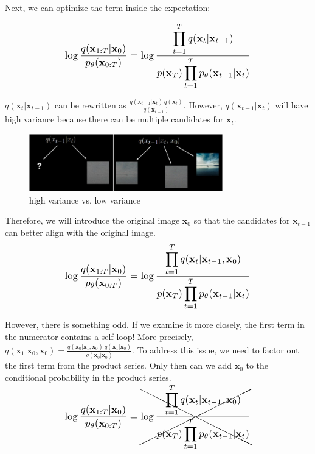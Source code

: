 \documentclass{article}
\newcommand*{\Scale}[2][4]{\scalebox{#1}{\ensuremath{#2}}}
\begin{document}
Next, we can optimize the term inside the expectation:

\begin{equation}
\Scale[1.2]{ \displaystyle \log \frac{q(\textbf{x}_{1:T}|\textbf{x}_0)}{p_\theta(\textbf{x}_{0:T})} = \log \frac{\displaystyle \prod_{t=1}^{T} q(\textbf{x}_{t}|\textbf{x}_{t-1})}{p(\textbf{x}_T) \displaystyle \prod_{t=1}^{T} p_\theta(\textbf{x}_{t-1}|\textbf{x}_{t})} }
\end{equation}

$ q(\textbf{x}_{t}|\textbf{x}_{t-1}) $ can be rewritten as $ \frac{q(\textbf{x}_{t-1}|\textbf{x}_t) \ q(\textbf{x}_t) }{ q(\textbf{x}_{t-1}) } $. However, $ q(\textbf{x}_{t-1}|\textbf{x}_t) $ will have high variance because there can be multiple candidates for $ \textbf{x}_{t} $.
\begin{figure}[h]
    \centering
    \includegraphics[width=0.75\textwidth]{fig/high-variance-vs-low-variance.png}
    \caption{high variance vs. low variance}
    \label{fig:high-variance-vs-low-variance}
\end{figure}

Therefore, we will introduce the original image $ \textbf{x}_0 $ so that the candidates for $ \textbf{x}_{t-1} $ can better align with the original image.
\begin{equation}
\Scale[1.2]{ \displaystyle \log \frac{q(\textbf{x}_{1:T}|\textbf{x}_0)}{p_\theta(\textbf{x}_{0:T})} = \log \frac{\displaystyle \prod_{t=1}^{T} q(\textbf{x}_{t}|\textbf{x}_{t-1},\textbf{x}_0) } { p(\textbf{x}_T) \displaystyle \prod_{t=1}^{T} p_\theta(\textbf{x}_{t-1}|\textbf{x}_{t})} }
\end{equation}

However, there is something odd. If we examine it more closely, the first term in the numerator contains a self-loop! More precisely, $ q(\textbf{x}_1|\textbf{x}_0,\textbf{x}_0) = \frac{q(\textbf{x}_0|\textbf{x}_1,\textbf{x}_0) \ q(\textbf{x}_1|\textbf{x}_0) }{ q(\textbf{x}_0|\textbf{x}_0) } $. To address this issue, we need to factor out the first term from the product series. Only then can we add $ \textbf{x}_0 $ to the conditional probability in the product series.
\begin{equation}
\Scale[1.2]{ \displaystyle \log \frac{q(\textbf{x}_{1:T}|\textbf{x}_0)}{p_\theta(\textbf{x}_{0:T})} =\xcancel{ \log \frac{\displaystyle \prod_{t=1}^{T} q(\textbf{x}_{t}|\textbf{x}_{t-1},\textbf{x}_0) } { p(\textbf{x}_T) \displaystyle \prod_{t=1}^{T} p_\theta(\textbf{x}_{t-1}|\textbf{x}_{t})} } }
\end{equation}
\end{document}
